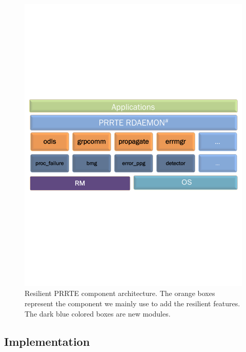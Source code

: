 \documentclass[sigconf]{acmart}
\newcommand{\prrte}[0]{\textsc{PRRTE}\xspace}
\begin{document}
\begin{figure}[h]
  \centering
  \includegraphics[trim=0.2cm 9.0cm 0.2cm 9cm,width=\linewidth]{PMIx_PRRTE.pdf}
  \caption{Resilient \prrte component architecture. The orange boxes represent the component we mainly use to add the resilient features. The dark blue colored boxes are new modules.}\label{fig:prrte}
\end{figure}

\subsection{Implementation}

\end{document}
